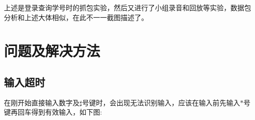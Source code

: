 \documentclass[a4paper,AutoFakeBold,oneside,12pt]{book}
\begin{document}
上述是登录查询学号时的抓包实验，然后又进行了小组录音和回放等实验，数据包分析和上述大体相似，在此不一一截图描述了。

\section{问题及解决方法}
\subsection{输入超时}
在刚开始直接输入数字及$\sharp$号键时，会出现无法识别输入，应该在输入前先输入$\ast$号键再回车得到有效输入，如下图:







\end{document}
